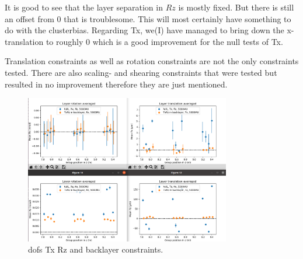 It is good to see that the layer separation in $Rz$ is mostly fixed. But there is still an offset from 0 that is troublesome. This will most certainly have something to do with the clusterbias. Regarding Tx, we(I) have managed to bring down the x-translation to roughly 0 which is a good improvement for the null tests of Tx.

Translation constraints as well as rotation constraints are not the only constraints tested. There are also scaling- and shearing constraints that were tested but
resulted in no improvement therefore they are just mentioned.

%



\begin{figure}
  \centering
  \includegraphics[width=0.8\textwidth]{plots/oct_4/TxRz_config5_backlayer.png}
  \caption{dofs Tx Rz and backlayer constraints.}
  \label{fig:oct4}
\end{figure}

